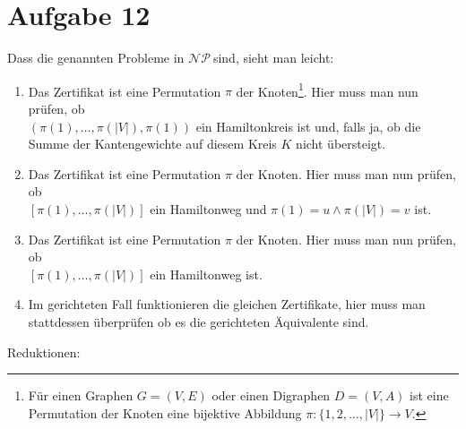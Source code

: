 \documentclass[a4paper,10pt,german]{scrartcl}
\newcommand{\NP}{\ensuremath{\mathcal{NP\ }}}
\begin{document}
\section*{Aufgabe 12}
Dass die genannten Probleme in \NP sind, sieht man leicht:
\begin{enumerate}
 \item Das Zertifikat ist eine Permutation $\pi$ der Knoten\footnote{Für einen Graphen $G=(V,E)$ oder einen Digraphen $D=(V,A)$ ist eine Permutation der Knoten eine bijektive Abbildung $\pi:\{1,2,\dots,|V|\}\to V$.}. Hier muss man nun prüfen, ob \\
 $(\pi(1),\dots,\pi(|V|),\pi(1))$ ein Hamiltonkreis ist und, falls ja, ob die Summe der Kantengewichte auf diesem Kreis $K$ nicht übersteigt.
 \item Das Zertifikat ist eine Permutation $\pi$ der Knoten\footnotemark[1]. Hier muss man nun prüfen, ob \\
 $[\pi(1),\dots,\pi(|V|)]$ ein Hamiltonweg und $\pi(1)=u\wedge \pi(|V|)=v$ ist.
 \item Das Zertifikat ist eine Permutation $\pi$ der Knoten\footnotemark[1]. Hier muss man nun prüfen, ob \\
 $[\pi(1),\dots,\pi(|V|)]$ ein Hamiltonweg ist.
 \item Im gerichteten Fall funktionieren die gleichen Zertifikate, hier muss man stattdessen überprüfen ob es die gerichteten Äquivalente sind.
\end{enumerate}
Reduktionen:
\end{document}

